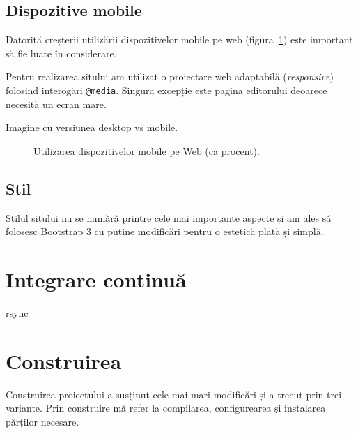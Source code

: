 \documentclass[a4wide,12pt]{report}
\newcommand{\eng}[1]{\emph{#1}} %
\newcommand{\cod}[1]{\texttt{#1}}
\newcommand{\idee}[1]{{\color{red} #1}}
\begin{document}
\subsection{Dispozitive mobile}

Datorită creșterii utilizării dispozitivelor mobile pe web
(figura~\ref{mobilefig}) este important să fie luate în considerare.

Pentru realizarea sitului am utilizat o proiectare web adaptabilă
(\eng{responsive}) folosind interogări \cod{@media}. Singura excepție este
pagina editorului deoarece necesită un ecran mare.

\idee{Imagine cu versiunea desktop vs mobile.}

\begin{figure}[hb]
\begin{center}
\end{center}
\caption{Utilizarea dispozitivelor mobile pe Web (ca procent)\cite{statcount}.}
\label{mobilefig}
\end{figure}

\subsection{Stil}

Stilul sitului nu se numără printre cele mai importante aspecte și am ales să
folosesc Bootstrap 3 cu puține modificări pentru o estetică plată și simplă.

\section{Integrare continuă}

\idee{rsync}

\section{Construirea}

Construirea proiectului a susținut cele mai mari modificări și a trecut prin
trei variante. Prin construire mă refer la compilarea, configurearea și
instalarea părților necesare.
\end{document}
